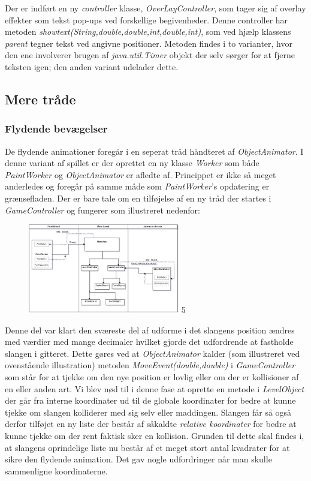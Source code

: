\documentclass[]{article}
\begin{document}
	Der er indført en ny \textit{controller} klasse, \textit{OverLayController}, som tager sig af overlay effekter som tekst pop-ups ved forskellige begivenheder. Denne controller har metoden \textit{showtext(String,double,double,int,double,int)}, som ved hjælp klassens \textit{parent} tegner tekst ved angivne positioner. Metoden findes i to varianter, hvor den ene involverer brugen af \textit{java.util.Timer} objekt der selv sørger for at fjerne teksten igen; den anden variant udelader dette.
	
	\subsection{Mere tråde}
	\subsubsection{Flydende bevægelser}
	
	De flydende animationer foregår i en seperat tråd håndteret af \textit{ObjectAnimator}. I denne variant af spillet er der oprettet en ny klasse \textit{Worker} som både \textit{PaintWorker} og \textit{ObjectAnimator} er afledte af. Princippet er ikke så meget anderledes og foregår på samme måde som \textit{PaintWorker}'s opdatering er grænsefladen. Der er bare tale om en tilføjelse af en ny tråd der startes i \textit{GameController} og fungerer som illustreret nedenfor:
	
	\begin{figure}[h!]
		\centering
		\includegraphics[width=250px]{Thread_diagram_2.jpg}
		\label{fig:thread2}5
	\end{figure}
	
	Denne del var klart den sværeste del af udforme i det slangens position ændres med værdier med mange decimaler hvilket gjorde det udfordrende at fastholde slangen i gitteret. Dette gøres ved at \textit{ObjectAnimator} kalder (som illustreret ved ovenstående illustration) metoden \textit{MoveEvent(double,double)} i \textit{GameController} som står for at tjekke om den nye position er lovlig eller om der er kollisioner af en eller anden art. Vi blev nød til i denne fase at oprette en metode i \textit{LevelObject} der går fra interne koordinater ud til de globale koordinater for bedre at kunne tjekke om slangen kolliderer med sig selv eller maddingen. Slangen får så også derfor tilføjet en ny liste der består af såkaldte \textit{relative koordinater} for bedre at kunne tjekke om der rent faktisk sker en kollision. Grunden til dette skal findes i, at slangens oprindelige liste nu består af et meget stort antal kvadrater for at sikre den flydende animation. Det gav nogle udfordringer når man skulle sammenligne koordinaterne.\\
	
\end{document}
